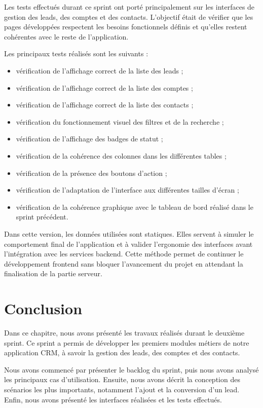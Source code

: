 \documentclass[12pt,a4paper]{report}
\begin{document}
Les tests effectués durant ce sprint ont porté principalement sur les interfaces de gestion des leads, des comptes et des contacts. L’objectif était de vérifier que les pages développées respectent les besoins fonctionnels définis et qu’elles restent cohérentes avec le reste de l’application.

Les principaux tests réalisés sont les suivants :

\begin{itemize}
    \item vérification de l’affichage correct de la liste des leads ;
    \item vérification de l’affichage correct de la liste des comptes ;
    \item vérification de l’affichage correct de la liste des contacts ;
    \item vérification du fonctionnement visuel des filtres et de la recherche ;
    \item vérification de l’affichage des badges de statut ;
    \item vérification de la cohérence des colonnes dans les différentes tables ;
    \item vérification de la présence des boutons d’action ;
    \item vérification de l’adaptation de l’interface aux différentes tailles d’écran ;
    \item vérification de la cohérence graphique avec le tableau de bord réalisé dans le sprint précédent.
\end{itemize}

Dans cette version, les données utilisées sont statiques. Elles servent à simuler le comportement final de l’application et à valider l’ergonomie des interfaces avant l’intégration avec les services backend. Cette méthode permet de continuer le développement frontend sans bloquer l’avancement du projet en attendant la finalisation de la partie serveur.

\section*{Conclusion}

Dans ce chapitre, nous avons présenté les travaux réalisés durant le deuxième sprint. Ce sprint a permis de développer les premiers modules métiers de notre application CRM, à savoir la gestion des leads, des comptes et des contacts.

Nous avons commencé par présenter le backlog du sprint, puis nous avons analysé les principaux cas d’utilisation. Ensuite, nous avons décrit la conception des scénarios les plus importants, notamment l’ajout et la conversion d’un lead. Enfin, nous avons présenté les interfaces réalisées et les tests effectués.
\end{document}
